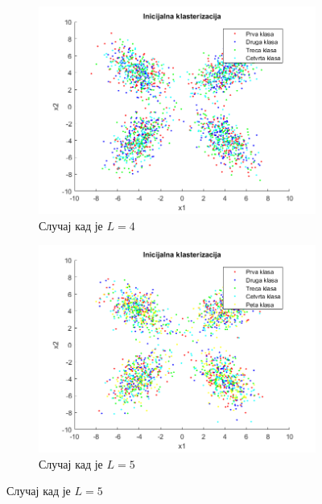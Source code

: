\begin{figure}[htb!]
\begin{subfigure}{.55\textwidth}
\includegraphics[width=1\linewidth]{pictures/4/CMean4Init}
\caption{Случај кад је $L=4$}\label{pic:cMean4Init}
\end{subfigure}
\begin{subfigure}{.55\textwidth}
\centering
\includegraphics[width=1\linewidth]{pictures/4/CMean5Init}
\caption{Случај кад је $L=5$}\label{pic:cMean5Init}
\end{subfigure}
\end{figure}

